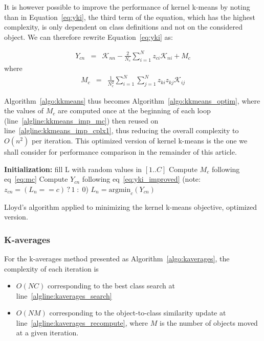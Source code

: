 \documentclass[natbib,smallextended]{svjour3}
\begin{document}
It is however possible to improve the performance of kernel k-means by noting than in Equation~\ref{eq:yki}, the third term of the equation, which has the highest complexity, is only dependent on class definitions and not on the considered object. We can therefore rewrite Equation~\ref{eq:yki} as:

\begin{eqnarray}
Y_{cn} & = & \mathcal{K}_{nn} - \frac{2}{N_c} \sum_{i=1}^{N} z_{ci} \mathcal{K}_{ni} + M_c \label{eq:yki_improved}
\end{eqnarray}
where
\begin{eqnarray}
M_c    & = & \frac{1}{N_c^2} \sum_{i=1}^{N} \sum_{j=1}^{N} z_{ki} z_{kj} \mathcal{K}_{ij} \label{eq:mc}
\end{eqnarray}

Algorithm~\ref{algo:kkmeans} thus becomes Algorithm~\ref{algo:kkmeans_optim}, where the values of $M_c$ are computed once at the beginning of each loop (line~\ref{algline:kkmeans_imp_mc}) then reused on line~\ref{algline:kkmeans_imp_cplx1}, thus reducing the overall complexity to $O(n^2)$ per iteration. This optimized version of kernel k-means is the one we shall consider for performance comparison in the remainder of this article.

\begin{algorithm}
	\label{algo:kkmeans_optim}
	\SetAlgoLined
	\BlankLine
	\textbf{Initialization:}
	fill L with random values in $[1..C]$\;
	\BlankLine
	 {
	     {
	        Compute $M_c$ following eq~\ref{eq:mc} \label{algline:kkmeans_imp_mc}
	    }
		 {
			 {
				Compute $Y_{cn}$ following eq~\ref{eq:yki_improved} \label{algline:kkmeans_imp_cplx1}
				(note: $z_{cn} = (L_n == c)\,?\,1\;:\;0$)
			}
			$L_n = \textrm{argmin}_c (Y_{cn})$\;
		}
	}
	\BlankLine
	\caption{Lloyd's algorithm applied to minimizing the kernel k-means objective, optimized version.}
\end{algorithm}


\subsubsection{K-averages}

For the k-averages method presented as Algorithm~\ref{algo:kaverages}, the complexity of each iteration is
\begin{itemize}
\item $O(NC)$ corresponding to the best class search at line~\ref{algline:kaverages_search}
\item  $O(NM)$ corresponding to the object-to-class similarity update at line~\ref{algline:kaverages_recompute}, where $M$ is the number of objects moved at a given iteration.
\end{itemize}
\end{document}
